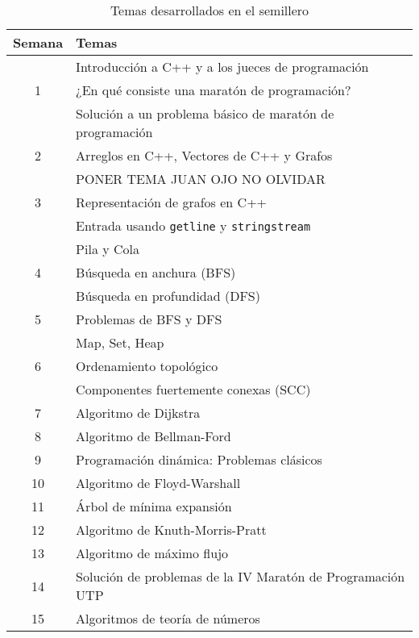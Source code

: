 \documentclass[conference]{IEEEtran}
\begin{document}
\begin{table}
	\centering
	\begin{tabular}{|c|l|}
		\hline
		\textbf{Semana} & \textbf{Temas}\\
		\hline
		  & Introducción a C++ y a los jueces de programación \\
		1 & ¿En qué consiste una maratón de programación?\\
		  & Solución a un problema básico de maratón de programación\\
		\hline
		2 & Arreglos en C++, Vectores de C++ y Grafos\\
		\hline
		  & {\color{red}PONER TEMA JUAN OJO NO OLVIDAR} \\
		3 & Representación de grafos en C++\\
		  & Entrada usando \verb|getline| y \verb|stringstream|\\
		\hline
		  & Pila y Cola\\
		4 & Búsqueda en anchura (BFS)\\
		  & Búsqueda en profundidad (DFS)\\
		\hline
		5 & Problemas de BFS y DFS\\
		\hline
		  & Map, Set, Heap\\
		6 & Ordenamiento topológico\\
		  & Componentes fuertemente conexas (SCC)\\
		\hline
		7 & Algoritmo de Dijkstra \\
		\hline 
		8 & Algoritmo de Bellman-Ford\\
		\hline 
		9 & Programación dinámica: Problemas clásicos\\
		\hline
		10 & Algoritmo de Floyd-Warshall\\
		\hline
		11 & Árbol de mínima expansión\\
		\hline
		12 & Algoritmo de Knuth-Morris-Pratt\\
		\hline
		13 & Algoritmo de máximo flujo\\
		\hline
		14 & Solución de problemas de la IV Maratón de Programación UTP\\
		\hline
		15 & Algoritmos de teoría de números\\
		\hline 
	\end{tabular}
	
	\quad \\
	\caption{Temas desarrollados en el semillero}
	\label{Tabla:temas}
\end{table}
\end{document}
